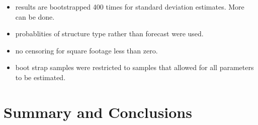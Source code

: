 \documentclass{article}
\begin{document}
\begin{itemize}
  \item results are bootstrapped 400 times for standard deviation estimates.  More can be done.
  \item probablities of structure type rather than forecast were used.
  \item no censoring for square footage less than zero.
  \item boot strap samples were restricted to samples that allowed for all parameters to be estimated.
\end{itemize}




\section{Summary and Conclusions}

\nocite{*}


\end{document}
